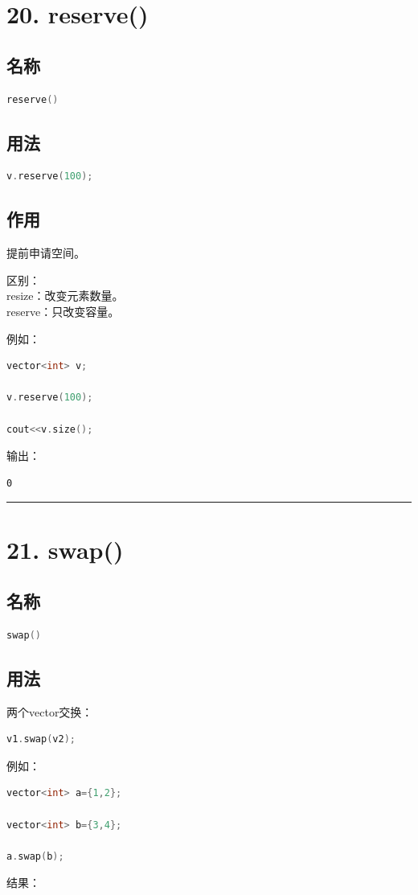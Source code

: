 \documentclass[9pt,twocolumn]{extarticle}
\begin{document}
\section{20. reserve()}

\subsection{名称}
\begin{lstlisting}[language=C++]
reserve()
\end{lstlisting}

\subsection{用法}
\begin{lstlisting}[language=C++]
v.reserve(100);
\end{lstlisting}

\subsection{作用}
提前申请空间。

区别：\\
resize：改变元素数量。\\
reserve：只改变容量。

例如：
\begin{lstlisting}[language=C++]
vector<int> v;

v.reserve(100);

cout<<v.size();
\end{lstlisting}
输出：
\begin{lstlisting}
0
\end{lstlisting}

\noindent\rule{\linewidth}{0.4pt}

\section{21. swap()}

\subsection{名称}
\begin{lstlisting}[language=C++]
swap()
\end{lstlisting}

\subsection{用法}
两个vector交换：
\begin{lstlisting}[language=C++]
v1.swap(v2);
\end{lstlisting}
例如：
\begin{lstlisting}[language=C++]
vector<int> a={1,2};

vector<int> b={3,4};

a.swap(b);
\end{lstlisting}
结果：
\end{document}
